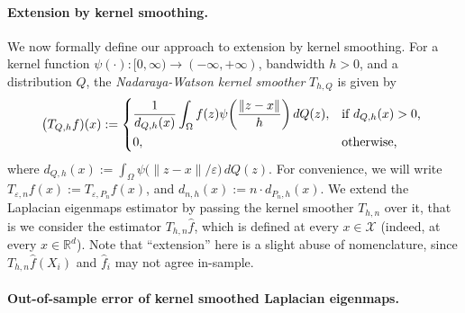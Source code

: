 \documentclass{article}
\newcommand{\Reals}{\mathbb{R}}
\newcommand{\1}{\mathbf{1}}
\newcommand{\Rd}{\Reals^d}
\newcommand{\mc}[1]{\mathcal{#1}}
\newcommand{\wh}[1]{\widehat{#1}}
\theoremstyle{alden}
\theoremstyle{aldenthm}
\theoremstyle{definition}
\theoremstyle{remark}
\begin{document}
\paragraph{Extension by kernel smoothing.}
We now formally define our approach to extension by kernel smoothing. For a kernel function $\psi(\cdot): [0,\infty) \to (-\infty,+\infty)$, bandwidth $h > 0$, and a distribution $Q$, the \emph{Nadaraya-Watson kernel smoother} $T_{h,Q}$ is given by
\begin{equation*}
\bigl(T_{Q,h}f)(x) := 
\begin{dcases*}
\frac{1}{d_{Q,h}(x)} \int_{\Omega} f(z)\psi\biggl(\frac{\|z - x\|}{h}\biggr) \,dQ(z), & \textrm{if $d_{Q,h}(x) > 0$,} \\
0, &\textrm{otherwise,}
\end{dcases*}
\end{equation*}
where $d_{Q,h}(x) := \int_{\Omega} \psi\bigl(\|z - x\|/\varepsilon\bigr) \,dQ(z)$. For convenience, we will write $T_{\varepsilon,n}f(x) := T_{\varepsilon,P_n}f(x)$, and $d_{n,h}(x) := n \cdot d_{P_n,h}(x)$.  We extend the Laplacian eigenmaps estimator by passing the kernel smoother $T_{h,n}$ over it, that is we consider the estimator $T_{h,n}\wh{f}$, which is defined at every $x \in \mc{X}$ (indeed, at every $x \in \Rd$). Note that ``extension'' here is a slight abuse of nomenclature, since $T_{h,n}\wh{f}(X_i)$ and $\wh{f}_i$ may not agree in-sample.

\paragraph{Out-of-sample error of kernel smoothed Laplacian eigenmaps.}
\end{document}
